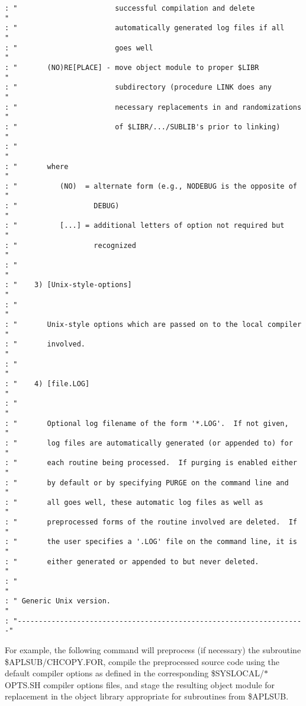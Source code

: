 \begin{verbatim}
: "                       successful compilation and delete            "
: "                       automatically generated log files if all     "
: "                       goes well                                    "
: "       (NO)RE[PLACE] - move object module to proper $LIBR           "
: "                       subdirectory (procedure LINK does any        "
: "                       necessary replacements in and randomizations "
: "                       of $LIBR/.../SUBLIB's prior to linking)      "
: "                                                                    "
: "       where                                                        "
: "          (NO)  = alternate form (e.g., NODEBUG is the opposite of  "
: "                  DEBUG)                                            "
: "          [...] = additional letters of option not required but     "
: "                  recognized                                        "
: "                                                                    "
: "    3) [Unix-style-options]                                         "
: "                                                                    "
: "       Unix-style options which are passed on to the local compiler "
: "       involved.                                                    "
: "                                                                    "
: "    4) [file.LOG]                                                   "
: "                                                                    "
: "       Optional log filename of the form '*.LOG'.  If not given,    "
: "       log files are automatically generated (or appended to) for   "
: "       each routine being processed.  If purging is enabled either  "
: "       by default or by specifying PURGE on the command line and    "
: "       all goes well, these automatic log files as well as          "
: "       preprocessed forms of the routine involved are deleted.  If  "
: "       the user specifies a '.LOG' file on the command line, it is  "
: "       either generated or appended to but never deleted.           "
: "                                                                    "
: " Generic Unix version.                                              "
: "--------------------------------------------------------------------"

\end{verbatim}
For example, the following command will preprocess (if necessary) the
subroutine \$APLSUB/CHCOPY.FOR, compile the preprocessed source code
using the default compiler options as defined in the corresponding
\$SYSLOCAL/$\ast$OPTS.SH compiler options files, and stage the resulting
object module for replacement in the object library appropriate for
subroutines from \$APLSUB.

